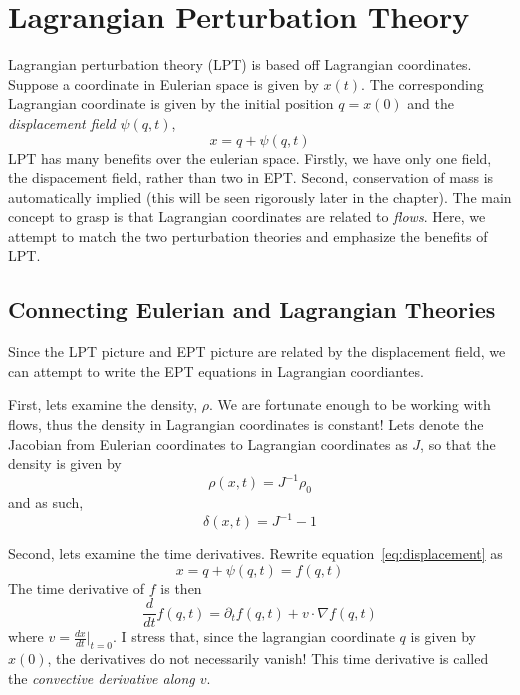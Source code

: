 \chapter{Lagrangian Perturbation Theory}
Lagrangian perturbation theory (LPT) is based off Lagrangian coordinates. Suppose a coordinate in Eulerian space is given by $x(t)$. The corresponding Lagrangian coordinate is given by the initial position $q=x(0)$ and the \emph{displacement field} $\psi(q,t)$,
\begin{equation}
	x = q+\psi(q,t)
	\label{eq:displacement}
\end{equation}
LPT has many benefits over the eulerian space. Firstly, we have only one field, the dispacement field, rather than two in EPT. Second, conservation of mass is automatically implied (this will be seen rigorously later in the chapter). The main concept to grasp is that Lagrangian coordinates are related to \emph{flows}. Here, we attempt to match the two perturbation theories and emphasize the benefits of LPT.

\section{Connecting Eulerian and Lagrangian Theories}
Since the LPT picture and EPT picture are related by the displacement field, we can attempt to write the EPT equations in Lagrangian coordiantes. 

First, lets examine the density, $\rho$. We are fortunate enough to be working with flows, thus the density in Lagrangian coordinates is constant! Lets denote the Jacobian from Eulerian coordinates to Lagrangian coordinates as $J$, so that the density is given by
\begin{equation}
	\rho(x,t) = J^{-1}\rho_0
\end{equation}
and as such,
\begin{equation}
	\delta(x,t) = J^{-1}-1
\end{equation}

Second, lets examine the time derivatives. Rewrite equation~\ref{eq:displacement} as
\begin{equation}
	x = q+\psi(q,t) = f(q,t)
\end{equation}
The time derivative of $f$ is then
\begin{equation}
	\frac{d}{dt}f(q,t) = \partial_t f(q,t) + v \cdot \nabla f(q,t)
	\label{eq:lagrange_euler}
\end{equation}
where $v = \frac{dx}{dt}|_{t=0}$. I stress that, since the lagrangian coordinate $q$ is given by $x(0)$, the derivatives do not necessarily vanish! This time derivative is called the \emph{convective derivative along $v$}.

